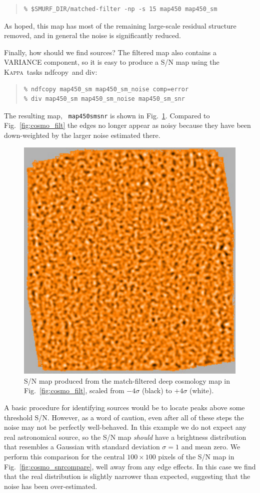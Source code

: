 \documentclass[twoside,11pt]{article}
\newcommand{\xref}[3]{#1}
\renewcommand{\_}{\texttt{\symbol{95}}}
\newenvironment{myquote}{\begin{quote}\begin{small}}{\end{small}\end{quote}}
\newcommand{\Kappa}{\xref{\textsc{Kappa}}{sun95}{}}
\newcommand{\task}[1]{\textsf{#1}}
\newcommand{\ndfcopy}{\xref{\task{ndfcopy}}{sun95}{NDFCOPY}}
\newcommand{\Div}{\xref{\task{div}}{sun95}{DIV}}
\begin{document}
\begin{myquote}
\begin{verbatim}
% $SMURF_DIR/matched-filter -np -s 15 map450 map450_sm
\end{verbatim}
\end{myquote}

As hoped, this map has most of the remaining large-scale residual
structure removed, and in general the noise is significantly reduced.

Finally, how should we find sources? The filtered map also contains a
VARIANCE component, so it is easy to produce a S/N map using the \Kappa\
tasks \ndfcopy\ and \Div:

\begin{myquote}
\begin{verbatim}
% ndfcopy map450_sm map450_sm_noise comp=error
% div map450_sm map450_sm_noise map450_sm_snr
\end{verbatim}
\end{myquote}

The resulting map, \texttt{ map450\_sm\_snr} is shown in
Fig.~\ref{fig:cosmo_snr}. Compared to Fig.~\ref{fig:cosmo_filt} the
edges no longer appear as noisy because they have been down-weighted
by the larger noise estimated there.

\begin{figure}
\begin{center}
\includegraphics[width=0.49\linewidth]{sc19_cosmo_map_snr}
\caption{S/N map produced from the match-filtered deep cosmology map
  in Fig.~\ref{fig:cosmo_filt}, scaled from $-4\sigma$ (black) to
  $+4\sigma$ (white).}
\label{fig:cosmo_snr}
\end{center}
\end{figure}

A basic procedure for identifying sources would be to locate peaks
above some threshold S/N. However, as a word of caution, even after
all of these steps the noise may not be perfectly well-behaved. In
this example we do not expect any real astronomical source, so the S/N
map {\em should} have a brightness distribution that resembles a
Gaussian with standard deviation $\sigma=1$ and mean zero. We perform
this comparison for the central $100 \times 100$ pixels of the S/N map
in Fig.~\ref{fig:cosmo_snrcompare}, well away from any edge
effects. In this case we find that the real distribution is slightly
narrower than expected, suggesting that the noise has been
over-estimated.
\end{document}
